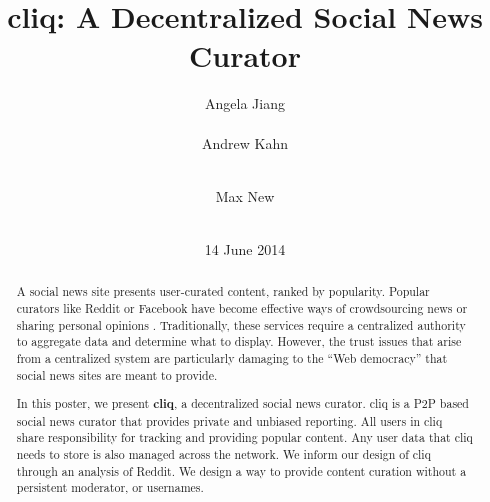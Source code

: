 \documentclass{sig-alternate}
\begin{document}
\nocite{*}


\title{cliq: A Decentralized Social News Curator}


\author{
\alignauthor Angela Jiang\\
  \\
\alignauthor Andrew Kahn\\
  \\
\and
\alignauthor Max New\\
  \\
}

\date{14 June 2014}

\maketitle
\begin{abstract}
A social news site presents user-curated content, ranked by popularity. Popular 
curators like Reddit or Facebook have become effective ways of crowdsourcing 
news or sharing personal opinions \cite{Weninger:reddit}. Traditionally, these services require a 
centralized authority to aggregate data and determine what to display. However, 
the trust issues that arise from a centralized system are particularly damaging to 
the ``Web democracy'' that social news sites are meant to provide. 

In this poster, we present {\bf cliq}, a decentralized social news curator. cliq is a P2P based 
social news curator that provides private and unbiased reporting. All users in cliq share 
responsibility for tracking and providing popular content. Any user data that cliq needs 
to store is also managed across the network. We inform our design of cliq through 
an analysis of Reddit. We design a way to provide content curation without a persistent 
moderator, or usernames.
\end{abstract}
\end{document}

